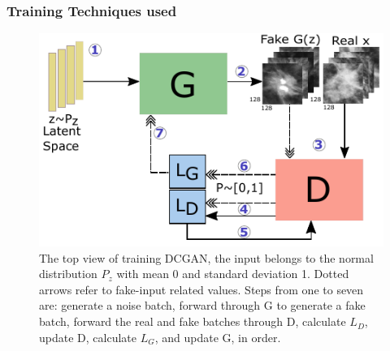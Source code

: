 \documentclass[final,3p,twocolumn,authoryear,sort&compress,times]{maia}
\begin{document}
\subsubsection{Training Techniques used}
\begin{figure}[h]
    \centering
    \includegraphics{figures/GAN.pdf}
    \caption{The top view of training DCGAN, the input belongs to the normal distribution $P_z$ with mean 0 and standard deviation 1. Dotted arrows refer to fake-input related values. Steps from one to seven are: generate a noise batch, forward through G to generate a fake batch, forward the real and fake batches through D, calculate $L_D$, update D, calculate $L_G$, and update G, in order. }
    \label{fig:GAN_training}
\end{figure}
\end{document}
